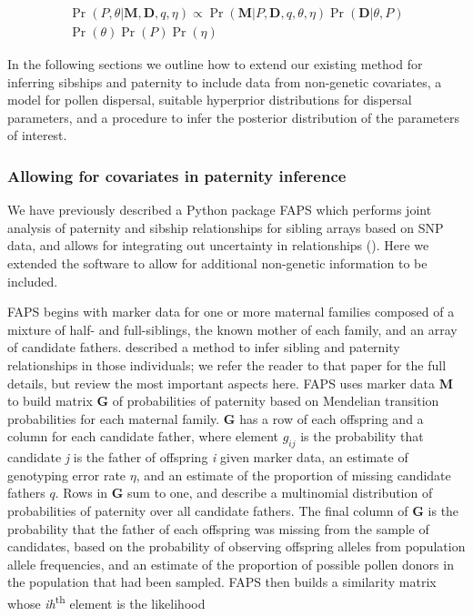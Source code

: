 \documentclass[10pt, a4paper, twocolumn]{article} %
\begin{document}
\begin{equation}
\label{eqn:probability_model}
\begin{split}
\Pr( P, \theta | \textbf{M}, \textbf{D}, q, \eta) \propto \Pr(\textbf{M} | P, \textbf{D}, q,\theta, \eta)
\Pr(\textbf{D} | \theta, P) \\
\Pr(\theta) \Pr(P) \Pr(\eta)
\end{split}
\end{equation}

In the following sections we outline how to extend our existing method for inferring sibships and paternity to include data from non-genetic covariates, a model for pollen dispersal, suitable hyperprior distributions for dispersal parameters, and a procedure to infer the posterior distribution of the parameters of interest.

\subsubsection{Allowing for covariates in paternity inference}

We have previously described a Python package FAPS which performs joint analysis of paternity and sibship relationships for sibling arrays based on SNP data, and allows for integrating out uncertainty in relationships (\cite{ellis2018efficient}). Here we extended the software to allow for additional non-genetic information to be included.

FAPS begins with marker data for one or more maternal families composed of a mixture of half- and full-siblings, the known mother of each family, and an array of candidate fathers.
\cite{ellis2018efficient} described a method to infer sibling and paternity relationships in those individuals; we refer the reader to that paper for the full details, but review the most important aspects here.
FAPS uses marker data \textbf{M} to build matrix \textbf{G} of probabilities of paternity based on Mendelian transition probabilities for each maternal family. \textbf{G} has a row of each offspring and a column for each candidate father, where element $g_{ij}$ is the probability that candidate \textit{j} is the father of offspring \textit{i} given marker data, an estimate of genotyping error rate $\eta$, and an estimate of the proportion of missing candidate fathers $q$. Rows in \textbf{G} sum to one, and describe a multinomial distribution of probabilities of paternity over all candidate fathers. The final column of \textbf{G} is the probability that the father of each offspring was missing from the sample of candidates, based on the probability of observing offspring alleles from population allele frequencies, and an estimate of the proportion of possible pollen donors in the population that had been sampled. FAPS then builds a similarity matrix whose \textit{ih}\textsuperscript{th} element is the likelihood 
\end{document}
